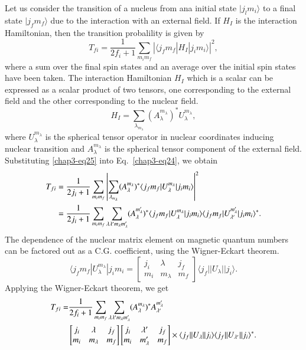 Let us consider the transition of a nucleus from ana initial state $|j_l m_i \rangle$ to a final state $| j_f m_f \rangle$ due to the interaction with an external field. If $H_I$ is the interaction Hamiltonian, then the transition probalility is given by
\setcounter{equation}{23}
\begin{equation}
  T_{fi} = \frac{1}{2f_i +1} \sum_{m_i m_f} | \langle j_f m_f |H_I| j_i m_i \rangle |^2, \label{chap3-eq24}
\end{equation}
where a sum over the final spin states and an average over the initial spin states have been taken. The interaction Hamiltonian $H_I$ which is a scalar can be expressed as a scalar product of two tensors, one corresponding to the external field and the other corresponding to the nuclear field.
\begin{equation}
  H_I = \sum_{\lambda_{m_\lambda}} (A_\lambda^{m_\lambda})^\ast U_\lambda^{m_\lambda}, \label{chap3-eq25}
\end{equation}
where $U_\lambda^{m_\lambda}$ is the spherical tensor operator in nuclear coordinates inducing nuclear transition and $A_\lambda^{m_\lambda}$ is the spherical tensor component of the external field. Substituting \eqref{chap3-eq25} into Eq.\ \eqref{chap3-eq24}, we obtain
\begin{align}
  T_{fi} & = \frac{1}{2j_i +1} \sum_{m_im_f} \left| \sum_{\lambda_{m_\lambda}} (A_\lambda^{m_\lambda})^\ast \langle j_f m_f | U_\lambda^{m_\lambda}| j_i m_i \rangle \right|^2 \notag \\
  & = \frac{1}{2j_i +1} \sum_{m_i m_f} \sum_{\lambda \lambda' m_{\lambda} m_{\lambda}'} (A_{\lambda}^{m_\lambda'})^\ast \langle j_f m_f |U_\lambda^{m_\lambda} | j_i m_i \rangle \langle j_f m_f | U_{\lambda '}^{m_\lambda '}| j_i m_i \rangle^\ast. \label{chap3-eq26}
\end{align}
The dependence of the nuclear matrix element on magnetic quantum numbers can be factored out as a C.G. coefficient, using the Wigner-Eckart theorem.
\begin{equation}
  \langle j_f m_f | U_\lambda^{m_\lambda}| j_i m_i =
  \begin{bmatrix} j_i & \lambda & j_f\\ m_i & m_\lambda & m_f \end{bmatrix} \langle j_f || U_\lambda|| j_i \rangle . \label{chap3-eq27}
\end{equation}
Applying the Wigner-Eckart theorem, we get
\begin{align}
  T_{fi}  = & \frac{1}{2f_i+1} \sum_{m_i m_f} \sum_{\lambda \lambda' m_\lambda m_\lambda'} (A_\lambda^{m_\lambda})^\ast A_{\lambda'}^{m_\lambda'}
  \notag \\
 &  \begin{bmatrix} j_i & \lambda & j_f \\ m_i & m_\lambda & m_f\end{bmatrix}
    \begin{bmatrix} j_i & \lambda' & j_f \\ m_i & m_\lambda' & m_f\end{bmatrix}
      \times \langle j_f || U_\lambda || j_i \rangle \langle j_f || U_{\lambda'} || j_i \rangle^\ast. \label{chap3-eq28}
\end{align}
